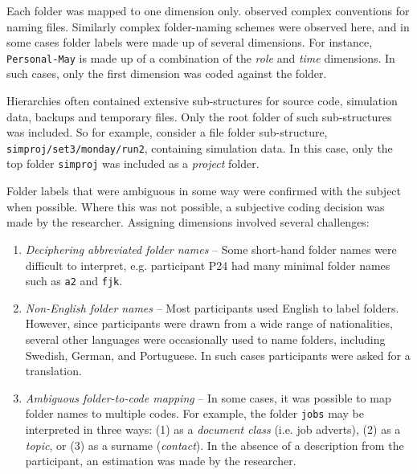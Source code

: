 Each folder was mapped to one dimension only.  \citet{jc:82} observed complex conventions for naming files.  Similarly complex folder-naming schemes were observed here, and in some cases folder labels were made up of several dimensions. For instance, \texttt{Personal-May} is made up of a combination of the \textit{role} and \textit{time} dimensions.  In such cases, only the first dimension was coded against the folder. %

Hierarchies often contained extensive sub-structures for source code, simulation data, backups and temporary files. Only the root folder of such sub-structures was included. So for example, consider a file folder sub-structure, \texttt{simproj/set3/monday/run2}, containing simulation data. In this case, only the top folder \texttt{simproj} was included as a \textit{project} folder.

Folder labels that were ambiguous in some way were confirmed with the subject when possible. Where this was not possible, a subjective coding decision was made by the researcher.  Assigning dimensions involved several challenges:

\begin{enumerate}

\item \textit{Deciphering abbreviated folder names} -- Some short-hand folder names were difficult to interpret, e.g. participant P24 had many minimal folder names such as \texttt{a2} and \texttt{fjk}.

\item \textit{Non-English folder names} -- Most participants used English to label folders.  However, since participants were drawn from a wide range of nationalities, several other languages were occasionally used to name folders, including Swedish, German, and Portuguese.  In such cases participants were asked for a translation.  %

\item \textit{Ambiguous folder-to-code mapping} -- In some cases, it was possible to map folder names to multiple codes.  For example, the folder \texttt{jobs} may be interpreted in three ways: (1) as a \textit{document class} (i.e. job adverts), (2) as a \textit{topic}, or (3) as a surname (\textit{contact}).  In the absence of a description from the participant, an estimation was made by the researcher.



\end{enumerate}		

